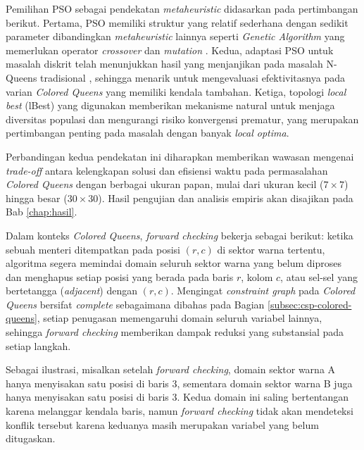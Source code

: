 Pemilihan PSO sebagai pendekatan \textit{metaheuristic} didasarkan pada pertimbangan berikut. Pertama, PSO memiliki struktur yang relatif sederhana dengan sedikit parameter dibandingkan \textit{metaheuristic} lainnya seperti \textit{Genetic Algorithm} yang memerlukan operator \textit{crossover} dan \textit{mutation} \cite{kennedy1995particle}. Kedua, adaptasi PSO untuk masalah diskrit telah menunjukkan hasil yang menjanjikan pada masalah N-Queens tradisional \cite{hu2003swarm}, sehingga menarik untuk mengevaluasi efektivitasnya pada varian \textit{Colored Queens} yang memiliki kendala tambahan. Ketiga, topologi \textit{local best} (lBest) yang digunakan memberikan mekanisme natural untuk menjaga diversitas populasi dan mengurangi risiko konvergensi prematur, yang merupakan pertimbangan penting pada masalah dengan banyak \textit{local optima}.

Perbandingan kedua pendekatan ini diharapkan memberikan wawasan mengenai \textit{trade-off} antara kelengkapan solusi dan efisiensi waktu pada permasalahan \textit{Colored Queens} dengan berbagai ukuran papan, mulai dari ukuran kecil ($7 \times 7$) hingga besar ($30 \times 30$). Hasil pengujian dan analisis empiris akan disajikan pada Bab \ref{chap:hasil}.



Dalam konteks \textit{Colored Queens}, \textit{forward checking} bekerja sebagai berikut: ketika sebuah menteri ditempatkan pada posisi $(r, c)$ di sektor warna tertentu, algoritma segera memindai domain seluruh sektor warna yang belum diproses dan menghapus setiap posisi yang berada pada baris $r$, kolom $c$, atau sel-sel yang bertetangga (\textit{adjacent}) dengan $(r, c)$. Mengingat \textit{constraint graph} pada \textit{Colored Queens} bersifat \textit{complete} sebagaimana dibahas pada Bagian \ref{subsec:csp-colored-queens}, setiap penugasan memengaruhi domain seluruh variabel lainnya, sehingga \textit{forward checking} memberikan dampak reduksi yang substansial pada setiap langkah.

Sebagai ilustrasi, misalkan setelah \textit{forward checking}, domain sektor warna A hanya menyisakan satu posisi di baris 3, sementara domain sektor warna B juga hanya menyisakan satu posisi di baris 3. Kedua domain ini saling bertentangan karena melanggar kendala baris, namun \textit{forward checking} tidak akan mendeteksi konflik tersebut karena keduanya masih merupakan variabel yang belum ditugaskan.



